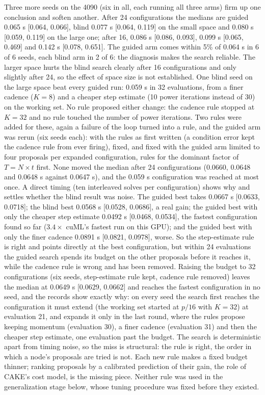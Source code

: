 \documentclass[11pt]{article}
\begin{document}
Three more seeds on the 4090 (six in all, each running all three arms) firm up
one conclusion and soften another. After 24 configurations the medians are
guided 0.065 s [0.064, 0.066], blind 0.077 s [0.064, 0.119] on the small space and
0.080 s [0.059, 0.119] on the large one; after 16, 0.086 s [0.086, 0.093], 0.099 s
[0.065, 0.469] and 0.142 s [0.078, 0.651]. The guided arm comes within 5\% of
0.064 s in 6 of 6 seeds, each blind arm in 2 of 6: the diagnosis makes the search
reliable. The larger space hurts the blind search clearly after 16
configurations and only slightly after 24, so the effect of space size is not
established. One blind seed on the large space beat every guided run: 0.059 s in
32 evaluations, from a finer cadence ($K=8$) and a cheaper step estimate (10 power
iterations instead of 30) on the working set. No rule proposed either change: the
cadence rule stopped at $K=32$ and no rule touched the number of power
iterations. Two rules were added for these, again a failure of the loop turned
into a rule, and the guided arm was rerun (six seeds each): with the rules as
first written (a condition error kept the cadence rule from ever firing), fixed,
and fixed with the guided arm limited to four proposals per expanded
configuration, rules for the dominant factor of $T=N\times t$ first. None moved the
median after 24 configurations (0.0660, 0.0648 and 0.0648 s against 0.0647 s), and
the 0.059 s configuration was reached at most once. A direct timing (ten
interleaved solves per configuration) shows why and settles whether the blind
result was noise. The guided best takes 0.0667 s [0.0633, 0.0718]; the blind best
0.0568 s [0.0528, 0.0686], a real gain; the guided best with only the cheaper step
estimate 0.0492 s [0.0468, 0.0534], the fastest configuration found so far
($3.4\times$ cuML's fastest run on this GPU); and the guided best with only the finer
cadence 0.0891 s [0.0821, 0.0978], worse. So the step-estimate rule is right and
points directly at the best configuration, but within 24 evaluations the guided
search spends its budget on the other proposals before it reaches it, while the
cadence rule is wrong and has been removed. Raising the budget to 32 configurations (six seeds,
step-estimate rule kept, cadence rule removed) leaves the median at 0.0649 s
[0.0629, 0.0662] and reaches the fastest configuration in no seed, and the records
show exactly why: on every seed the search first reaches the configuration it
must extend (the working set started at $p/16$ with $K=32$) at evaluation 21, and
expands it only in the last round, where the rules propose keeping momentum
(evaluation 30), a finer cadence (evaluation 31) and then the cheaper step
estimate, one evaluation past the budget. The search is deterministic apart from
timing noise, so the miss is structural: the rule is right, the order in which a
node's proposals are tried is not. Each new rule makes a fixed budget
thinner; ranking proposals by a calibrated prediction of their gain, the role of
CAKE's cost model, is the missing piece. Neither rule was used in the
generalization stage below, whose tuning procedure was fixed before they existed.
\end{document}

